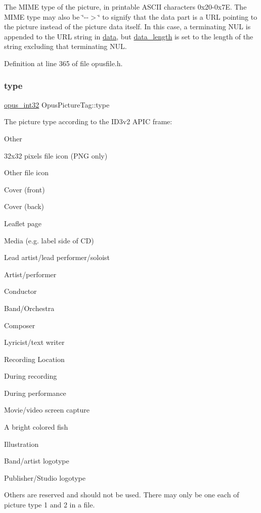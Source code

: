 The M\+I\+ME type of the picture, in printable A\+S\+C\+II characters 0x20-\/0x7E. The M\+I\+ME type may also be {\ttfamily \char`\"{}-\/-\/$>$\char`\"{}} to signify that the data part is a U\+RL pointing to the picture instead of the picture data itself. In this case, a terminating N\+UL is appended to the U\+RL string in \mbox{\hyperlink{struct_opus_picture_tag_a0514cb1431547c8b3042b9f3bc9b694f}{data}}, but \mbox{\hyperlink{struct_opus_picture_tag_aaa458d48cd3c9c86b54614389f5b726d}{data\+\_\+length}} is set to the length of the string excluding that terminating N\+UL. 

Definition at line 365 of file opusfile.\+h.

\mbox{\label{struct_opus_picture_tag_a6e668caeb395b1ec7d438d4a4a9fa845}} 
\subsubsection{\texorpdfstring{type}{type}}
{\footnotesize\ttfamily \mbox{\hyperlink{opus__types_8h_aa4d309d6f80b99dbabebc8f98879ab9a}{opus\+\_\+int32}} Opus\+Picture\+Tag\+::type}

The picture type according to the I\+D3v2 A\+P\+IC frame\+: 
\begin{DoxyEnumerate}
\item Other 
\item 32x32 pixels \textquotesingle{}file icon\textquotesingle{} (P\+NG only) 
\item Other file icon 
\item Cover (front) 
\item Cover (back) 
\item Leaflet page 
\item Media (e.\+g. label side of CD) 
\item Lead artist/lead performer/soloist 
\item Artist/performer 
\item Conductor 
\item Band/\+Orchestra 
\item Composer 
\item Lyricist/text writer 
\item Recording Location 
\item During recording 
\item During performance 
\item Movie/video screen capture 
\item A bright colored fish 
\item Illustration 
\item Band/artist logotype 
\item Publisher/\+Studio logotype 
\end{DoxyEnumerate}Others are reserved and should not be used. There may only be one each of picture type 1 and 2 in a file. 

